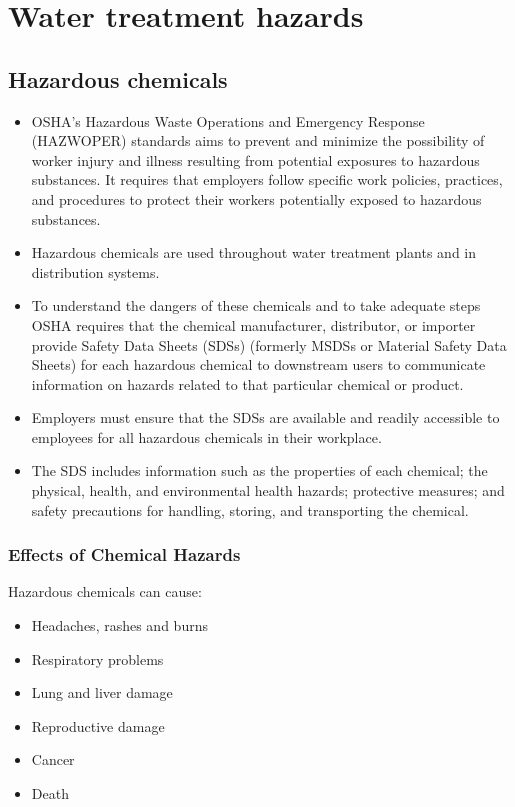 \section{Water treatment hazards}
\subsection{Hazardous chemicals}
\begin{itemize}
\item OSHA's Hazardous Waste Operations and Emergency Response (HAZWOPER)  standards aims to prevent and minimize the possibility of worker injury and illness resulting from potential exposures to hazardous substances.  It requires that employers follow specific work policies, practices, and procedures to protect their workers potentially exposed to hazardous substances.
\item Hazardous chemicals are used throughout water treatment plants and in distribution systems. 
\item To understand the dangers of these chemicals and to take adequate steps OSHA  requires that the chemical manufacturer, distributor, or importer provide Safety Data Sheets (SDSs)  (formerly MSDSs or Material Safety Data Sheets) for each hazardous chemical to downstream users to communicate information on hazards related to that particular chemical or product.
\item Employers must ensure that the SDSs are available and readily accessible to employees for all hazardous chemicals in their workplace.
\item The SDS includes information such as the properties of each chemical; the physical, health, and environmental health hazards; protective measures; and safety precautions for handling, storing, and transporting the chemical.\\

\end{itemize}


\subsubsection{Effects of Chemical Hazards}

Hazardous chemicals can cause:
\begin{itemize}
\item Headaches, rashes and burns
\item Respiratory problems
\item Lung and liver damage
\item Reproductive damage
\item Cancer
\item Death
\end{itemize} 


